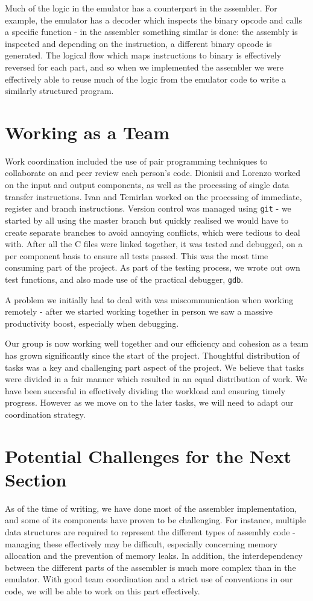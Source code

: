 \documentclass[11pt, oneside, USenglish]{article}
\begin{document}
Much of the logic in the emulator has a counterpart in the assembler. For example, the emulator has a decoder which inspects the binary opcode and calls a specific function - in the assembler something similar is done: the assembly is inspected and depending on the instruction, a different binary opcode is generated. The logical flow which maps instructions to binary is effectively reversed for each part, and so when we implemented the assembler we were effectively able to reuse much of the logic from the emulator code to write a similarly structured program.

\section{Working as a Team}
Work coordination included the use of pair programming techniques to collaborate on and peer review each person's code. 
Dionisii and Lorenzo worked on the input and output components, as well as the processing of single data transfer instructions. 
Ivan and Temirlan worked on the processing of immediate, register and branch instructions.
Version control was managed using \verb|git| - we started by all using the master branch but quickly realised we would have to create separate branches to avoid annoying conflicts, which were tedious to deal with.
After all the C files were linked together, it was tested and debugged, on a per component basis to ensure all tests passed.
This was the most time consuming part of the project. As part of the testing process, we wrote out own test functions, and also made use of the practical debugger, \verb|gdb|.

A problem we initially had to deal with was miscommunication when working remotely - after we started working together in person we saw a massive productivity boost, especially when debugging.

Our group is now working well together and our efficiency and cohesion as a team has grown significantly since the start of the project. Thoughtful distribution of tasks was a key and challenging part aspect of the project. We believe that tasks were divided in a fair manner which resulted in an equal distribution of work. 
We have been succesful in effectively dividing the workload and ensuring timely progress.
However as we move on to the later tasks, we will need to adapt our coordination strategy.


\section{Potential Challenges for the Next Section}
As of the time of writing, we have done most of the assembler implementation, and some of its components have proven to be challenging. For instance, multiple data structures are required to represent the different types of assembly code - managing these effectively may be difficult, especially concerning memory allocation and the prevention of memory leaks.
In addition, the interdependency between the different parts of the assembler is much more complex than in the emulator.
With good team coordination and a strict use of conventions in our code, we will be able to work on this part effectively.
\end{document}
